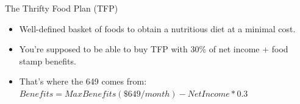 \documentclass{beamer}
\begin{document}
{
    \begin{frame}[plain]
     \end{frame}
}

\begin{frame}{The Thrifty Food Plan (TFP)}
  \setlength{\leftmargini}{1em}
\begin{itemize}
\item
Well-defined basket of foods to obtain a nutritious diet at a minimal cost.

\item
You're supposed to be able to buy TFP with 30\% of net income + food stamp benefits.

\item That's where the 649 comes from: $ Benefits=MaxBenefits(\$649/month)-NetIncome*0.3 $
\end{itemize}
\end{frame}
\end{document}

